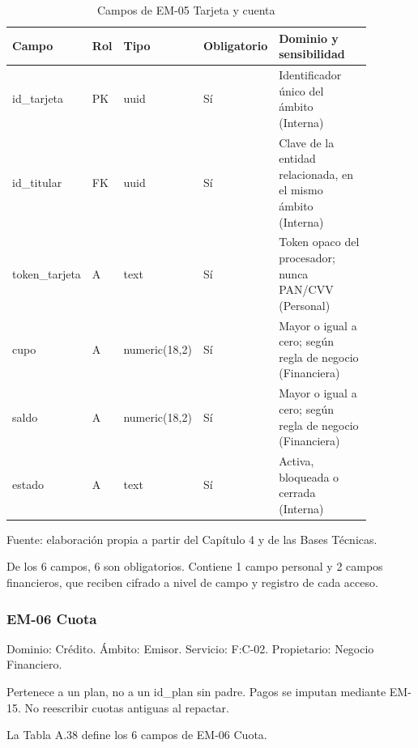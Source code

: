 \documentclass[11pt]{article}
\begin{document}
\begin{table}[htbp]
\caption{Campos de EM-05 Tarjeta y cuenta}\label{tab:d_em05}
\centering
\begin{tabular}{@{}p{0.167\linewidth}p{0.070\linewidth}p{0.079\linewidth}p{0.097\linewidth}p{0.465\linewidth}@{}}
\toprule Campo & Rol & Tipo & Obligatorio & Dominio y sensibilidad \\
\midrule
id\_tarjeta & PK & uuid & Sí & Identificador único del ámbito (Interna) \\
id\_titular & FK & uuid & Sí & Clave de la entidad relacionada, en el mismo ámbito (Interna) \\
token\_tarjeta & A & text & Sí & Token opaco del procesador; nunca PAN/CVV (Personal) \\
cupo & A & numeric(18,2) & Sí & Mayor o igual a cero; según regla de negocio (Financiera) \\
saldo & A & numeric(18,2) & Sí & Mayor o igual a cero; según regla de negocio (Financiera) \\
estado & A & text & Sí & Activa, bloqueada o cerrada (Interna) \\
\bottomrule
\end{tabular}
\par\smallskip
{\raggedright Fuente: elaboración propia a partir del Capítulo 4 y de las Bases Técnicas.\par}
\end{table}


De los 6 campos, 6 son obligatorios. Contiene 1 campo personal y 2 campos financieros, que reciben cifrado a nivel de campo y registro de cada acceso.

\subsubsection{EM-06 Cuota}

Dominio: Crédito. Ámbito: Emisor. Servicio: F:C-02. Propietario: Negocio Financiero.

Pertenece a un plan, no a un id\_plan sin padre. Pagos se imputan mediante EM-15. No reescribir cuotas antiguas al repactar.

La Tabla A.38 define los 6 campos de EM-06 Cuota.
\end{document}
